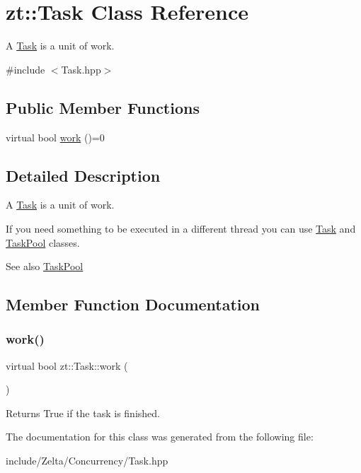 \hypertarget{classzt_1_1_task}{}\section{zt\+:\+:Task Class Reference}
\label{classzt_1_1_task}


A \hyperlink{classzt_1_1_task}{Task} is a unit of work.  




{\ttfamily \#include $<$Task.\+hpp$>$}

\subsection*{Public Member Functions}
\begin{DoxyCompactItemize}
\item 
virtual bool \hyperlink{classzt_1_1_task_a6026a3bc7552bd86653f1168919ae7ab}{work} ()=0
\end{DoxyCompactItemize}


\subsection{Detailed Description}
A \hyperlink{classzt_1_1_task}{Task} is a unit of work. 

If you need something to be executed in a different thread you can use \hyperlink{classzt_1_1_task}{Task} and \hyperlink{classzt_1_1_task_pool}{Task\+Pool} classes.

\begin{DoxySeeAlso}{See also}
\hyperlink{classzt_1_1_task_pool}{Task\+Pool} 
\end{DoxySeeAlso}


\subsection{Member Function Documentation}
\mbox{\label{classzt_1_1_task_a6026a3bc7552bd86653f1168919ae7ab}} 
\subsubsection{\texorpdfstring{work()}{work()}}
{\footnotesize\ttfamily virtual bool zt\+::\+Task\+::work (\begin{DoxyParamCaption}{ }\end{DoxyParamCaption})\hspace{0.3cm}{\ttfamily [pure virtual]}}

\begin{DoxyReturn}{Returns}
True if the task is finished. 
\end{DoxyReturn}


The documentation for this class was generated from the following file\+:\begin{DoxyCompactItemize}
\item 
include/\+Zelta/\+Concurrency/Task.\+hpp\end{DoxyCompactItemize}

